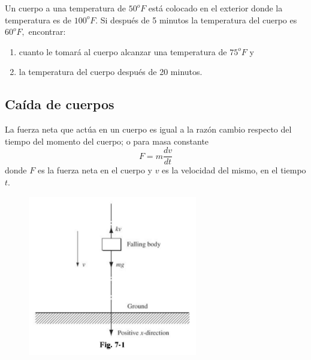 % 
%
%
% 
{}
	\begin{problema}
		Un cuerpo a una temperatura de $50^{o}F$ está colocado en el exterior donde la temperatura es de $100^{o}F.$ Si después de 5 minutos la temperatura del cuerpo es $60^{o}F,$ encontrar:
		\begin{enumerate}
			\item cuanto le tomará al cuerpo alcanzar una temperatura de $75^{o}F$ y
			\item la temperatura del cuerpo después de 20 minutos.
		\end{enumerate}
		
	\end{problema}
	

\subsection{Caída de cuerpos}


	\begin{observacion}
		La fuerza neta que actúa en un cuerpo es igual a la razón cambio respecto del tiempo del momento del cuerpo; o para masa constante
		\[
			\label{bron:7.3}
			F=m\dfrac{dv}{dt}
		\]
		donde $F$ es la fuerza neta en el cuerpo y $v$ es la velocidad del mismo, en el tiempo $t.$
	\end{observacion}
	




	\begin{figure}
		\centering
		\includegraphics[height=7cm,keepaspectratio=true]{./edo/img020501.png}
		\label{fig:020501}
	\end{figure}
	



